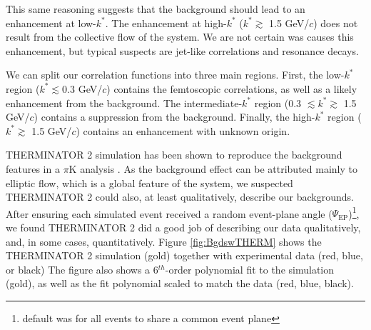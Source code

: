 \documentclass[../AnalysisNoteJBuxton.tex]{subfiles}
\begin{document}
This same reasoning suggests that the background should lead to an enhancement at low-$k^{*}$.  The enhancement at high-$k^{*}$ ($k^{*} \gtrsim$ 1.5 GeV/$c$) does not result from the collective flow of the system.  We are not certain was causes this enhancement, but typical suspects are jet-like correlations and resonance decays.

We can split our correlation functions into three main regions.  First, the low-$k^{*}$ region ($k^{*} \lesssim 0.3$ GeV/$c$) contains the femtoscopic correlations, as well as a likely enhancement from the background.  The intermediate-$k^{*}$ region (0.3 $\lesssim k^{*} \gtrsim$ 1.5 GeV/$c$) contains a suppression from the background.  Finally, the high-$k^{*}$ region ($k^{*} \gtrsim$ 1.5 GeV/$c$) contains an enhancement with unknown origin.

THERMINATOR 2 simulation has been shown to reproduce the background features in a $\pi$K analysis \cite{Kisiel:2017}.  As the background effect can be attributed mainly to elliptic flow, which is a global feature of the system, we suspected THERMINATOR 2 could also, at least qualitatively, describe our backgrounds.  After ensuring each simulated event received a random event-plane angle ($\Psi_{\mathrm{EP}}$)\footnote{default was for all events to share a common event plane}, we found THERMINATOR 2 did a good job of describing our data qualitatively, and, in some cases, quantitatively.  Figure \ref{fig:BgdswTHERM} shows the THERMINATOR 2 simulation (gold) together with experimental data (red, blue, or black)  The figure also shows a 6$^{th}$-order polynomial fit to the simulation (gold), as well as the fit polynomial scaled to match the data (red, blue, black).  
\end{document}

